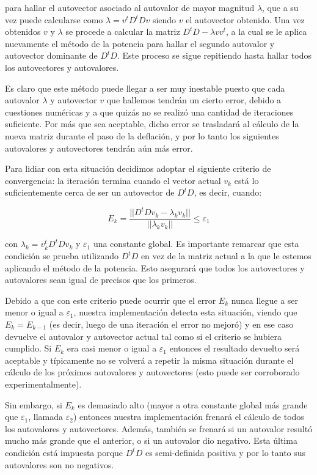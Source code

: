 \documentclass[a4paper]{article}
\begin{document}
\noindent para hallar el autovector asociado al autovalor de mayor magnitud $\lambda$, que a su vez puede calcularse como $\lambda = v^tD^tDv$ 
siendo $v$ el autovector obtenido. Una vez obtenidos $v$ y $\lambda$ se procede a calcular la matriz $D^tD - \lambda v v^t$, a la cual se le 
aplica nuevamente el método de la potencia para hallar el segundo autovalor y autovector dominante de $D^tD$. Este proceso se sigue repitiendo 
hasta hallar todos los autovectores y autovalores.

Es claro que este método puede llegar a ser muy inestable puesto que cada autovalor $\lambda$ y autovector $v$ que hallemos 
tendrán un cierto error, debido a cuestiones numéricas y a que quizás no se realizó una cantidad de iteraciones suficiente. Por más que sea 
aceptable, dicho error se trasladará al cálculo de la nueva matriz durante el paso de la deflación, y por lo tanto los siguientes autovalores 
y autovectores tendrán aún más error.

Para lidiar con esta situación decidimos adoptar el siguiente criterio de convergencia: la iteración termina cuando el vector actual $v_k$ está 
lo suficientemente cerca de ser un autovector de $D^tD$, es decir, cuando:

\[
E_k = \frac{||D^tDv_k - \lambda_k v_k||}{||\lambda_k v_k||} \leq \varepsilon_1
\]

\noindent con $\lambda_k = v_k^tD^tDv_k$ y $\varepsilon_1$ una constante global. Es importante remarcar que esta condición se prueba utilizando 
$D^tD$ en vez de la matriz actual a la que le estemos aplicando el método de la potencia. Esto asegurará que todos los autovectores y autovalores 
sean igual de precisos que los primeros.

Debido a que con este criterio puede ocurrir que el error $E_k$ nunca llegue a ser menor o igual a $\varepsilon_1$, nuestra implementación detecta 
esta situación, viendo que $E_k = E_{k-1}$ (es decir, luego de una iteración el error no mejoró) y en ese caso devuelve el autovalor y autovector 
actual tal como si el criterio se hubiera cumplido. Si $E_k$ era casi menor o igual a $\varepsilon_1$ entonces el resultado devuelto será aceptable 
y típicamente no se volverá a repetir la misma situación durante el cálculo de los próximos autovalores y autovectores (esto puede ser corroborado 
experimentalmente).

Sin embargo, si $E_k$ es demasiado alto (mayor a otra constante global más grande que $\varepsilon_1$, llamada $\varepsilon_2$) entonces nuestra 
implementación frenará el cálculo de todos los autovalores y autovectores. Además, también se frenará si un autovalor resultó mucho más grande que 
el anterior, o si un autovalor dio negativo. Esta última condición está impuesta porque $D^t D$ es semi-definida positiva y por lo tanto sus 
autovalores son no negativos. 
\end{document}
